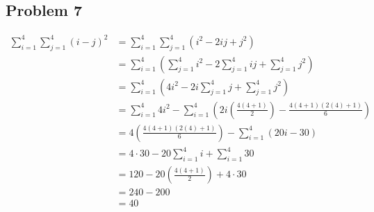 \documentclass{article}
\begin{document}
\begin{itemize}
\section*{Problem 7}
\setlength{\abovedisplayskip}{0pt}
\begin{align*}
	\sum_{i=1}^{4}\sum_{j=1}^{4}(i-j)^2
	&=\sum_{i=1}^{4}\sum_{j=1}^{4}\left(i^2-2ij+j^2\right) \\
	&=\sum_{i=1}^{4}\left(\sum_{j=1}^{4}i^2-2\sum_{j=1}^{4}ij+
		\sum_{j=1}^{4}j^2\right) \\
	&=\sum_{i=1}^{4}\left(4i^2-2i\sum_{j=1}^{4}j+
		\sum_{j=1}^{4}j^2\right) \\
	&=\sum_{i=1}^{4}4i^2-\sum_{i=1}^{4}\left(2i\left(\frac
		{4(4+1)}{2}\right)-\frac{4(4+1)(2(4)+1)}{6}\right) \\
	&=4\left(\frac{4(4+1)(2(4)+1)}{6}\right)-
		\sum_{i=1}^{4}\left(20i-30\right) \\
	&=4\cdot30-20\sum_{i=1}^{4}i+\sum_{i=1}^{4}30 \\
	&=120-20\left(\frac{4(4+1)}{2}\right)+4\cdot30 \\
	&=240-200 \\
	&=\boxed{40}
\end{align*}

\end{itemize}
\end{document}
